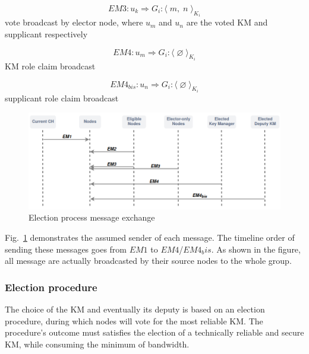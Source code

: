 \begin{equation}\label{eq8}
	EM3: u_k \Rightarrow G_i : \langle\; m,\; n\; \rangle_{K_i}
\end{equation}
vote broadcast by elector node, where $u_m$ and $u_n$ are the voted KM and supplicant respectively

\begin{equation}\label{eq9}
	EM4: u_m \Rightarrow G_i : \langle\; \varnothing\; \rangle_{K_i}
\end{equation}
KM role claim broadcast

\begin{equation}\label{eq9}
	EM4_{bis}: u_n \Rightarrow G_i : \langle\; \varnothing\; \rangle_{K_i}
\end{equation}
supplicant role claim broadcast

\begin{figure}[htbp]
	\centerline{\includegraphics[scale=0.40]{figures/election_exchange.png}}
	\caption{Election process message exchange}
	\label{fig:election_msg_exchange}
\end{figure}

Fig.~\ref{fig:election_msg_exchange} demonstrates the assumed sender of each message. The timeline order of sending these messages goes from $EM1$ to $EM4$/$EM4_bis$. As shown in the figure, all message are actually broadcasted by their source nodes to the whole group.

\subsubsection{Election procedure}

The choice of the KM and eventually its deputy is based on an election procedure, during which nodes will vote for the most reliable KM. The procedure’s outcome must satisfies the election of a technically reliable and secure KM, while consuming the minimum of bandwidth.

